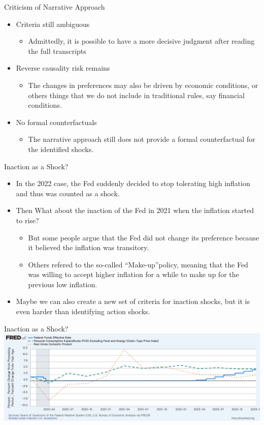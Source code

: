 \documentclass{beamer}
\begin{document}
\begin{frame}{Criticism of Narrative Approach}
  \begin{itemize}
    \item Criteria still ambiguous
    \begin{itemize}
        \item Admittedly, it is possible to have a more decisive judgment after reading the full transcripts
    \end{itemize}
    \item Reverse causality risk remains
    \begin{itemize}
        \item The changes in preferences may also be driven by economic conditions, or others things that we do not include in traditional rules, say financial conditions.
    \end{itemize}
    \item No formal counterfactuals
    \begin{itemize}
        \item The narrative approach still does not provide a formal counterfactual for the identified shocks.
    \end{itemize}
  \end{itemize}
\end{frame}
\begin{frame}{Inaction as a Shock?}
  \begin{itemize}
    \item In the 2022 case, the Fed suddenly decided to stop tolerating high inflation and thus was counted as a shock.
    \item Then What about the inaction of the Fed in 2021 when the inflation started to rise?
    \begin{itemize}
        \item But some people argue that the Fed did not change its preference because it believed the inflation was transitory.
        \item Others refered to the so-called ``Make-up''policy, meaning that the Fed was willing to accept higher inflation for a while to make up for the previous low inflation.
    \end{itemize}
    \item Maybe we can also create a new set of criteria for inaction shocks, but it is even harder than identifying action shocks.
  \end{itemize}
\end{frame}
\begin{frame}{Inaction as a Shock?}
  \centering
  \includegraphics[width=1\linewidth]{Graphs/2021Inaction.png}
\end{frame}
\end{document}
